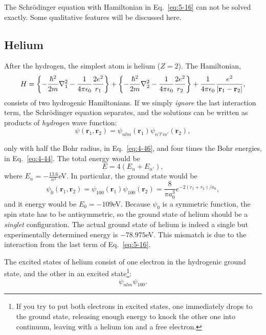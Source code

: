 The Schr\"odinger equation with Hamiltonian in Eq.~\eqref{eq:5-16} can not be solved exactly.
Some qualitative features will be discussed here.

\subsection{Helium}
After the hydrogen, the simplest atom is helium ($Z=2$).
The Hamiltonian,
\begin{equation}
  \label{eq:5-19}
  H = \left\{ - \frac{\hbar^{2}}{2m} \nabla_1^2 - \frac{1}{4\pi \epsilon_{0}} \frac{2e^{2}}{r_{1}} \right\} +  \left\{ - \frac{\hbar^{2}}{2m} \nabla_2^2 - \frac{1}{4\pi \epsilon_{0}} \frac{2e^{2}}{r_{2}} \right\} + \frac{1}{4\pi\epsilon_{0}} \frac{e^{2}}{\abs{\mathbf{r}_1- \mathbf{r}_{2}}},
  \end{equation}
consists of two hydrogenic Hamiltonians.
If we simply \textit{ignore} the last interaction term, the Schr\"odinger equation separates, and the solutions can be written as products of \textit{hydrogen} wave function:
\begin{equation}
  \label{eq:5-20}
 \psi \left( \mathbf{r}_1, \mathbf{r}_2 \right) = \psi_{nlm} \left( \mathbf{r}_1 \right) \psi_{n'l'm'} \left( \mathbf{r}_2 \right) ,
\end{equation}

only with half the Bohr radius, in Eq.~\eqref{eq:4-46}, and four times the Bohr energies, in Eq.~\eqref{eq:4-44}.
The total energy would be
\begin{equation}
  \label{eq:5-21}
 E = 4 \left( E_n + E_{n'} \right) ,
\end{equation}
where $E_n = - \frac{13.6}{n^{2}}$eV.
In particular, the ground state would be
\begin{equation}
  \label{eq:5-22}
 \psi_0 \left( \mathbf{r}_1, \mathbf{r}_2 \right) =\psi_{100} \left( \mathbf{r}_1 \right) \psi_{100} \left( \mathbf{r}_2 \right) = \frac{8}{\pi a_{0}^{3}} e^{-2 \left( r_1 + r_2 \right)/a_{0}},
\end{equation}
and it energy would be $E_0 = -109$eV.
Because $\psi_0$ is a symmetric function, the spin state has to be antisymmetric, so the ground state of helium should be a \textit{singlet} configuration.
The actual ground state of helium is indeed a single but experimentally determined energy is $-78.975$eV.
This mismatch is due to the interaction from the last term of Eq.~\eqref{eq:5-16}.

The excited states of helium consist of one electron in the hydrogenic ground state, and the other in an excited state\footnote{If you try to put both electrons in excited states, one immediately drops to the ground state, releasing enough energy to knock the other one into continuum, leaving with a helium ion and a free electron.}:
\begin{equation}
  \label{eq:5-23}
 \psi_{nlm}\psi_{100}.
\end{equation}











